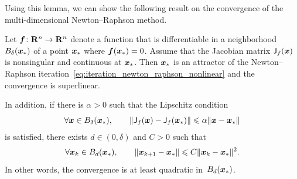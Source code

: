 Using this lemma,
we can show the following result on the convergence of the multi-dimensional Newton--Raphson method.
\begin{theorem}
    Let $\mathbf{\boldsymbol{f}}\colon \mathbf R^n \to \mathbf R^n$ denote a function that is differentiable in a neighborhood~$B_{\delta}(\mathbf{\boldsymbol{x}}_*)$
    of a point $\mathbf{\boldsymbol{x}}_*$ where $\mathbf{\boldsymbol{f}}(\mathbf{\boldsymbol{x}}_*) = 0$.
    Assume that the Jacobian matrix $\mathsf J_f(\mathbf{\boldsymbol{x}})$ is nonsingular and continuous at $\mathbf{\boldsymbol{x}}_*$.
    Then $\mathbf{\boldsymbol{x}}_*$ is an attractor of the Newton--Raphson iteration~\eqref{eq:iteration_newton_raphson_nonlinear}
    and the convergence is superlinear.

    In addition,
    if there is $\alpha > 0$ such that the Lipschitz condition
    \[
        \forall \mathbf{\boldsymbol{x}} \in B_{\delta}(\mathbf{\boldsymbol{x}}_*), \qquad
        \lVert\mathsf J_f(\mathbf{\boldsymbol{x}}) - \mathsf J_f(\mathbf{\boldsymbol{x}}_*)\rVert \leqslant \alpha \lVert\mathbf{\boldsymbol{x}} - \mathbf{\boldsymbol{x}}_*\rVert
    \]
    is satisfied,
    there exists $d \in (0, \delta)$ and $C > 0$ such that
    \[
        \forall \mathbf{\boldsymbol{x}}_k \in B_{d}(\mathbf{\boldsymbol{x}}_*), \qquad
        \lVert\mathbf{\boldsymbol{x}}_{k+1} - \mathbf{\boldsymbol{x}}_*\rVert\leqslant C\lVert\mathbf{\boldsymbol{x}}_k - \mathbf{\boldsymbol{x}}_*\rVert^2 .
    \]
    In other words, the convergence is at least quadratic in~$B_d(\mathbf{\boldsymbol{x}}_*)$.
\end{theorem}
